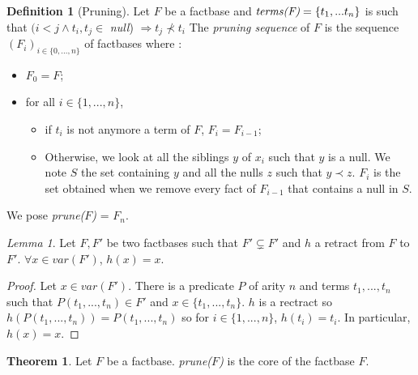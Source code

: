 \documentclass{article}
\theoremstyle{definition}
\newtheorem{definition}{Definition}[section]
\newtheorem{theorem}{Theorem}[section]
\theoremstyle{remark}
\newtheorem{lemma}{Lemma}[section]
\begin{document}
\begin{definition}[Pruning]
Let $F$ be a factbase and $\emph{terms(F)} = \{t_1,...t_n\}$ is such that $(i<j \wedge t_i,t_j \in$ \emph{null}) $\Rightarrow t_j \nprec t_i$
The \emph{pruning sequence} of $F$ is the sequence $(F_i)_{i \in \{0,...,n\}}$ of factbases where :
\begin{itemize}
\item $F_0 = F$;
\item for all $i \in \{1,...,n\}$,
\begin{itemize}
\item if $t_i$ is not anymore a term of $F$, $F_i = F_{i-1}$;
\item Otherwise, we look at all the siblings $y$ of $x_i$ such that $y$ is a null. We note $S$ the set containing $y$ and all the nulls $z$ such that $y \prec z$.  $F_i$ is the set obtained when we remove every fact of $F_{i-1}$  that contains a null in $S$.
\end{itemize}
\end{itemize}
We pose \emph{prune($F$)} = $F_n$.
\end{definition}

\begin{lemma}
Let $F,F'$ be two factbases such that $F' \subsetneq F'$ and $h$ a retract from $F$ to $F'$. $\forall x \in var(F')$, $h(x) =x$.
\end{lemma}

\begin{proof}
Let $x \in var(F')$. There is a predicate $P$ of arity $n$ and terms $t_1,...,t_n$ such that $P(t_1,...,t_n) \in F'$ and $x \in \{t_1,...,t_n\}$. $h$ is a rectract so $h(P(t_1,...,t_n)) = P(t_1,...,t_n)$ so for $i \in \{1,...,n\}$, $h(t_i) = t_i$. In particular, $h(x) = x$.
\end{proof}

\begin{theorem} 
Let $F$ be a factbase. \emph{prune($F$)} is the core of the factbase $F$.
\end{theorem}
\end{document}
